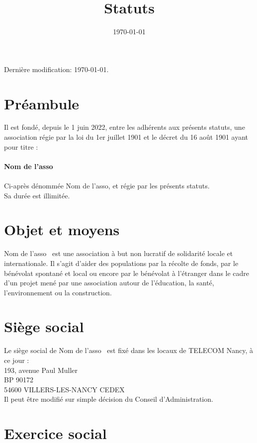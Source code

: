 \documentclass[12pt]{article}
\title{Statuts \asso}
\author{}
\date{\today}
\newcommand{\asso}{Nom de l'asso}
\newcommand{\dateCreation}{1 juin 2022}
\begin{document}
\maketitle

\vspace*{10cm}

Dernière modification: \today.

\section{Préambule}
\label{sec:preambule}

Il est fondé, depuis le \dateCreation, entre les adhérents aux présents statuts, une association régie par la loi du 1er juillet 1901 et le décret du 16 août 1901 ayant pour titre :\\
\\
\textbf{\asso}\\
\\
Ci-après dénommée \asso, et régie par les présents statuts.\\
Sa durée est illimitée.

\section{Objet et moyens}
\label{sec:objet}

\asso~ est une association à but non lucratif de solidarité locale et internationale.
Il s'agit d'aider des populations par la récolte de fonds, par le bénévolat spontané et local ou encore par le
bénévolat à l’étranger dans le cadre d’un projet mené par une association autour de l'éducation, la santé,
l'environnement ou la construction.

\section{Siège social}
\label{sec:siege}

Le siège social de \asso~ est fixé dans les locaux de TELECOM Nancy, à ce jour :\\
193, avenue Paul Muller\\
BP 90172\\
54600 VILLERS-LES-NANCY CEDEX\\
Il peut être modifié sur simple décision du Conseil d’Administration.

\section{Exercice social}
\label{sec:exercice}
\end{document}
